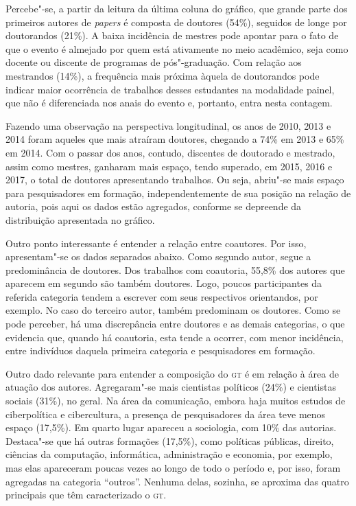 
Percebe"-se, a partir da leitura da última coluna do gráfico, que grande
parte dos primeiros autores de \textit{papers} é composta de
doutores (54\%), seguidos de longe por doutorandos (21\%). A
baixa incidência de mestres pode apontar para o fato de que o evento
é almejado por quem está ativamente no meio acadêmico, seja como docente
ou discente de programas de pós"-graduação. Com relação aos
mestrandos (14\%), a frequência mais próxima àquela de doutorandos
pode indicar maior ocorrência de trabalhos desses estudantes na
modalidade painel, que não é diferenciada nos anais do evento e,
portanto, entra nesta contagem.

Fazendo uma observação na perspectiva longitudinal, os anos de 2010,
2013 e 2014 foram aqueles que mais atraíram doutores, chegando a 74\%
em 2013 e 65\% em 2014. Com o passar dos anos, contudo, discentes de
doutorado e mestrado, assim como mestres, ganharam mais espaço, tendo
superado, em 2015, 2016 e 2017, o total de doutores apresentando
trabalhos. Ou seja, abriu"-se mais espaço para pesquisadores em
formação, independentemente de sua posição na relação de autoria, pois
aqui os dados estão agregados, conforme se depreende da distribuição
apresentada no gráfico.

Outro ponto interessante é entender a relação entre coautores. Por
isso, apresentam"-se os dados separados abaixo. Como segundo autor,
segue a predominância de doutores. Dos trabalhos com coautoria,
55,8\% dos autores que aparecem em segundo são também doutores.
Logo, poucos participantes da referida categoria tendem a escrever com
seus respectivos orientandos, por exemplo. No caso do
terceiro autor, também predominam os doutores. Como se pode
perceber, há uma discrepância entre doutores e as demais categorias,
o que evidencia que, quando há coautoria, esta tende a ocorrer, com
menor incidência, entre indivíduos daquela primeira categoria e
pesquisadores em formação.

Outro dado relevante para entender a composição do \textsc{gt} é em relação à
área de atuação dos autores. Agregaram"-se mais cientistas
políticos (24\%) e cientistas sociais (31\%), no geral. Na área da
comunicação, embora haja muitos estudos de ciberpolítica e cibercultura,
a presença de pesquisadores da área teve menos espaço (17,5\%). Em
quarto lugar apareceu a sociologia, com 10\% das autorias. Destaca"-se
que há outras formações (17,5\%), como políticas públicas, direito,
ciências da computação, informática, administração e economia, por
exemplo, mas elas apareceram poucas vezes ao longo de todo o período e,
por isso, foram agregadas na categoria ``outros''. Nenhuma delas,
sozinha, se aproxima das quatro principais que têm caracterizado o \textsc{gt}.


